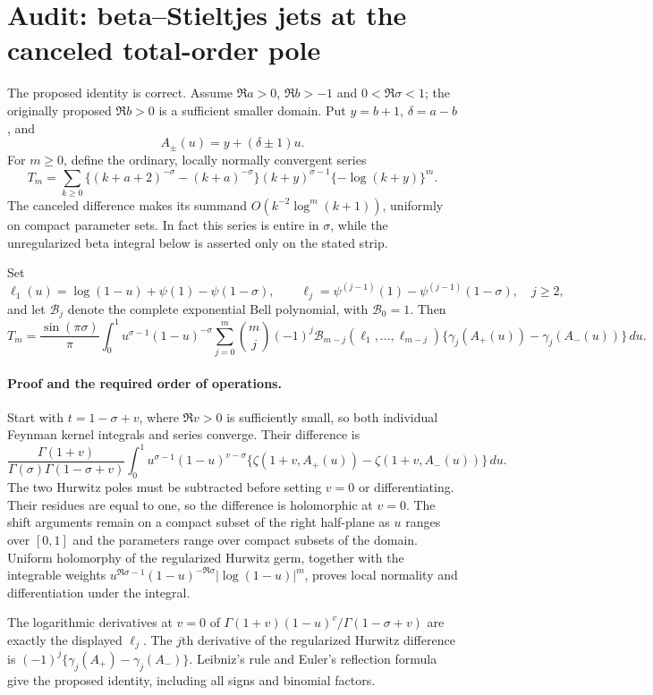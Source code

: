 \section*{Audit: beta--Stieltjes jets at the canceled total-order pole}

The proposed identity is correct.  Assume $\Re a>0$, $\Re b>-1$ and
$0<\Re\sigma<1$; the originally proposed $\Re b>0$ is a sufficient
smaller domain.  Put $y=b+1$, $\delta=a-b$, and
\[
 A_\pm(u)=y+(\delta\pm1)u.
\]
For $m\ge0$, define the ordinary, locally normally convergent series
\[
 T_m=\sum_{k\ge0}\bigl\{(k+a+2)^{-\sigma}-(k+a)^{-\sigma}\bigr\}
 (k+y)^{\sigma-1}\{-\log(k+y)\}^m.
\]
The canceled difference makes its summand
$O(k^{-2}\log^m(k+1))$, uniformly on compact parameter sets.  In fact
this series is entire in $\sigma$, while the unregularized beta integral
below is asserted only on the stated strip.

Set
\[
 \ell_1(u)=\log(1-u)+\psi(1)-\psi(1-\sigma),\qquad
 \ell_j=\psi^{(j-1)}(1)-\psi^{(j-1)}(1-\sigma),\quad j\ge2,
\]
and let $\mathcal B_j$ denote the complete exponential Bell polynomial,
with $\mathcal B_0=1$.  Then
\[
 T_m=\frac{\sin(\pi\sigma)}\pi
 \int_0^1u^{\sigma-1}(1-u)^{-\sigma}
 \sum_{j=0}^m\binom mj(-1)^j
 \mathcal B_{m-j}(\ell_1,\ldots,\ell_{m-j})
 \{\gamma_j(A_+(u))-\gamma_j(A_-(u))\}\,du.
\]

\paragraph{Proof and the required order of operations.}
Start with $t=1-\sigma+v$, where $\Re v>0$ is sufficiently small, so
both individual Feynman kernel integrals and series converge.  Their
difference is
\[
 \frac{\Gamma(1+v)}{\Gamma(\sigma)\Gamma(1-\sigma+v)}
 \int_0^1 u^{\sigma-1}(1-u)^{v-\sigma}
 \{\zeta(1+v,A_+(u))-\zeta(1+v,A_-(u))\}\,du.
\]
The two Hurwitz poles must be subtracted before setting $v=0$ or
differentiating.  Their residues are equal to one, so the difference
is holomorphic at $v=0$.  The shift arguments remain on a compact
subset of the right half-plane as $u$ ranges over $[0,1]$ and the
parameters range over compact subsets of the domain.  Uniform
holomorphy of the regularized Hurwitz germ, together with the integrable
weights
$u^{\Re\sigma-1}(1-u)^{-\Re\sigma}|\log(1-u)|^m$, proves local
normality and differentiation under the integral.

The logarithmic derivatives at $v=0$ of
$\Gamma(1+v)(1-u)^v/\Gamma(1-\sigma+v)$ are exactly the displayed
$\ell_j$.  The $j$th derivative of the regularized Hurwitz difference
is $(-1)^j\{\gamma_j(A_+)-\gamma_j(A_-)\}$.  Leibniz's rule and
Euler's reflection formula give the proposed identity, including all
signs and binomial factors.

